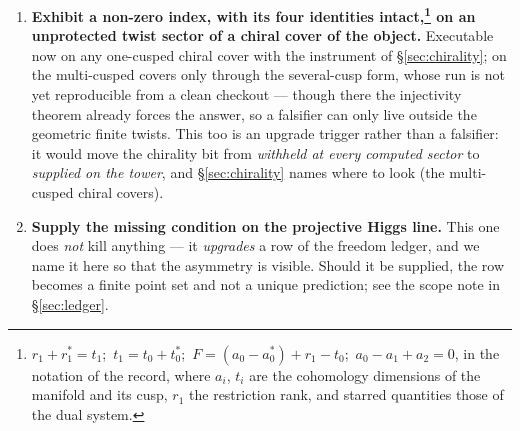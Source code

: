\documentclass[11pt,a4paper]{article}
\theoremstyle{definition}
\theoremstyle{remark}
\begin{document}
\begin{enumerate}[leftmargin=1.6em,itemsep=3pt]
without it the paper refutes itself in \S\ref{sec:forced}, since $(1,-4,2,-3,6)$ and $(1,2,-4,-3,6)$ are two
distinct rays that coincide only after relabelling $u^c \leftrightarrow d^c$. The qualifier ``over chiral matter'' also keeps
this item clear of \S\ref{sec:chirality}'s own rank-five vacuum, whose extra abelian factor acts on a vector-like spectrum.
\item \textbf{Exhibit a non-zero index, with its four identities intact,\footnote{$r_1 + r_1^* = t_1$;\ $t_1 = t_0 + t_0^*$;\
$F = (a_0 - a_0^*) + r_1 - t_0$;\ $a_0 - a_1 + a_2 = 0$, in the notation of the record, where $a_i$, $t_i$ are the
cohomology dimensions of the manifold and its cusp, $r_1$ the restriction rank, and starred quantities those of the
dual system.} on an unprotected twist sector of a chiral cover of the object.} Executable now on any one-cusped chiral cover with the instrument of \S\ref{sec:chirality}; on the multi-cusped covers only through the several-cusp form, whose run is not yet reproducible from a clean checkout --- though there the injectivity theorem already forces the answer, so a falsifier can only live outside the geometric finite twists. This too is an upgrade trigger rather than a falsifier: it would move the chirality
bit from \emph{withheld at every computed sector} to \emph{supplied on the tower}, and \S\ref{sec:chirality}
names where to look (the multi-cusped chiral covers).
\item \textbf{Supply the missing condition on the projective Higgs line.} This one does \emph{not}
kill anything --- it \emph{upgrades} a row of the freedom ledger, and we name it here so that the
asymmetry is visible. Should it be supplied, the row becomes a finite point set and not a unique
prediction; see the scope note in \S\ref{sec:ledger}.
\end{enumerate}
\end{document}
